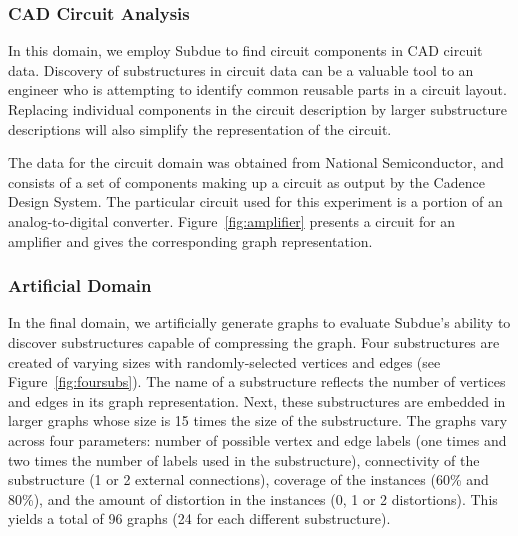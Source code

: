 

\subsubsection{CAD Circuit Analysis}

In this domain, we employ {\sc Subdue} to find circuit components in CAD
circuit data.  Discovery of substructures in circuit data can be a valuable
tool to an engineer who is attempting to identify common reusable parts in a
circuit layout.  Replacing individual components in the circuit description by
larger substructure descriptions will also simplify the representation of
the circuit.

The data for the circuit domain was obtained from National Semiconductor, and
consists of a set of components making up a circuit as output by the Cadence
Design System.  The particular circuit used for this
experiment is a portion of an analog-to-digital converter.
Figure~\ref{fig:amplifier} presents a circuit for an amplifier and gives
the corresponding graph representation.


\subsubsection{Artificial Domain}

In the final domain, we artificially generate graphs to evaluate {\sc Subdue}'s
ability to discover substructures capable of compressing the graph.
Four substructures are created of varying sizes with randomly-selected vertices
and edges (see Figure~\ref{fig:foursubs}).  The name of a substructure reflects
the number of vertices and edges in its graph representation.  Next, these
substructures are embedded in larger graphs whose size is 15 times the size of
the substructure.  The graphs vary across four parameters:
number of possible vertex and edge labels (one times and two times the number
of labels used in the substructure), connectivity of the substructure (1 or 2
external connections), coverage of the instances (60\% and 80\%), and the
amount of distortion in the instances (0, 1 or 2 distortions).  This yields a
total of 96 graphs (24 for each different substructure).



